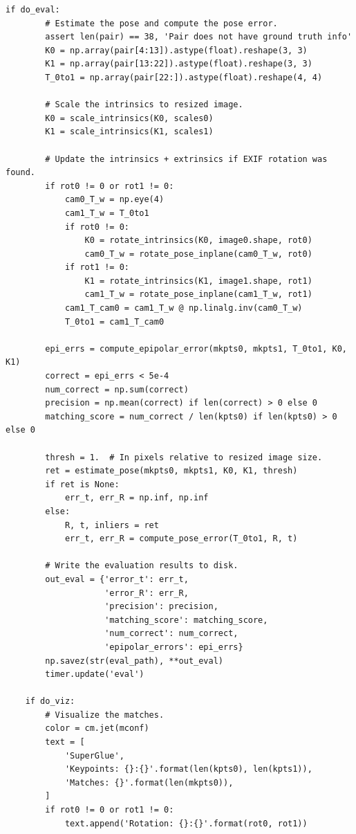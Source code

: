 \documentclass[letterpaper,12pt]{article}
\begin{document}
\begin{lstlisting}[caption={Sample Code Snippet for Evaluation},captionpos=b]
    if do_eval:
        # Estimate the pose and compute the pose error.
        assert len(pair) == 38, 'Pair does not have ground truth info'
        K0 = np.array(pair[4:13]).astype(float).reshape(3, 3)
        K1 = np.array(pair[13:22]).astype(float).reshape(3, 3)
        T_0to1 = np.array(pair[22:]).astype(float).reshape(4, 4)

        # Scale the intrinsics to resized image.
        K0 = scale_intrinsics(K0, scales0)
        K1 = scale_intrinsics(K1, scales1)

        # Update the intrinsics + extrinsics if EXIF rotation was found.
        if rot0 != 0 or rot1 != 0:
            cam0_T_w = np.eye(4)
            cam1_T_w = T_0to1
            if rot0 != 0:
                K0 = rotate_intrinsics(K0, image0.shape, rot0)
                cam0_T_w = rotate_pose_inplane(cam0_T_w, rot0)
            if rot1 != 0:
                K1 = rotate_intrinsics(K1, image1.shape, rot1)
                cam1_T_w = rotate_pose_inplane(cam1_T_w, rot1)
            cam1_T_cam0 = cam1_T_w @ np.linalg.inv(cam0_T_w)
            T_0to1 = cam1_T_cam0

        epi_errs = compute_epipolar_error(mkpts0, mkpts1, T_0to1, K0, K1)
        correct = epi_errs < 5e-4
        num_correct = np.sum(correct)
        precision = np.mean(correct) if len(correct) > 0 else 0
        matching_score = num_correct / len(kpts0) if len(kpts0) > 0 else 0

        thresh = 1.  # In pixels relative to resized image size.
        ret = estimate_pose(mkpts0, mkpts1, K0, K1, thresh)
        if ret is None:
            err_t, err_R = np.inf, np.inf
        else:
            R, t, inliers = ret
            err_t, err_R = compute_pose_error(T_0to1, R, t)

        # Write the evaluation results to disk.
        out_eval = {'error_t': err_t,
                    'error_R': err_R,
                    'precision': precision,
                    'matching_score': matching_score,
                    'num_correct': num_correct,
                    'epipolar_errors': epi_errs}
        np.savez(str(eval_path), **out_eval)
        timer.update('eval')

    if do_viz:
        # Visualize the matches.
        color = cm.jet(mconf)
        text = [
            'SuperGlue',
            'Keypoints: {}:{}'.format(len(kpts0), len(kpts1)),
            'Matches: {}'.format(len(mkpts0)),
        ]
        if rot0 != 0 or rot1 != 0:
            text.append('Rotation: {}:{}'.format(rot0, rot1))


\end{lstlisting}
\end{document}
